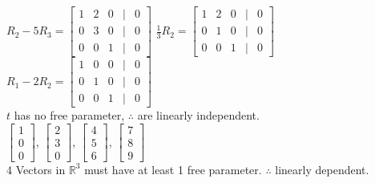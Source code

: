 \documentclass[a4paper]{article}
\begin{document}
$R_2 - 5R_3 = \begin{bmatrix}
1&2&0&|&0\\
0&3&0&|&0\\
0&0&1&|&0
\end{bmatrix}$
$\frac{1}{3}R_2 = \begin{bmatrix}
1&2&0&|&0\\
0&1&0&|&0\\
0&0&1&|&0
\end{bmatrix}$
$R_1 - 2R_2 = \begin{bmatrix}
1&0&0&|&0\\
0&1&0&|&0\\
0&0&1&|&0
\end{bmatrix}$\\
$t$ has no free parameter, $\therefore$ are linearly independent.\\
$\begin{bmatrix}
1\\
0\\
0
\end{bmatrix}$, $\begin{bmatrix}
2\\
3\\
0
\end{bmatrix}$, $\begin{bmatrix}
4\\
5\\
6
\end{bmatrix}$, $\begin{bmatrix}
7\\
8\\
9
\end{bmatrix}$\\
4 Vectors in $\mathbb{R}^3$ must have at least 1 free parameter. $\therefore$ linearly dependent.\\
\end{document}
